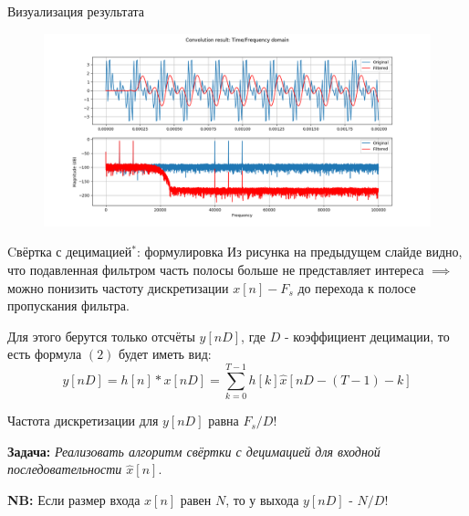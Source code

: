 \documentclass{beamer}
\begin{document}
    \begin{frame}{Визуализация результата}
        \begin{figure}[!tbp]
           \centering
           \includegraphics[width=\textwidth]{pics/result_regular.png}
           \captionsetup{justification=centering}
        \end{figure}
    \end{frame}
    \begin{frame}{Cвёртка с децимацией$^{*}$: формулировка}
        \justifying 
        Из рисунка на предыдущем слайде видно, что подавленная фильтром часть полосы больше не представляет интереса $\implies$ можно понизить частоту дискретизации $x[n] - F_{s}$ до перехода к полосе пропускания фильтра.
        \par
        Для этого берутся только отсчёты $y[nD]$, где $D$ - коэффициент децимации, то есть формула $(2)$ будет иметь вид:
        \begin{equation}
            y[nD] = h[n] * x[nD] = \sum_{k=0}^{T - 1} h[k]\hat x[nD - (T - 1) - k] \label{eq:conv_dec}
        \end{equation}
        \par
        Частота дискретизации для $y[nD]$ равна $F_{s}/D$!
        \par
        {\bf Задача:} {\it Реализовать алгоритм свёртки с децимацией для входной последовательности $\hat x[n]$}.
        \par
        {\bf NB:} Если размер входа $x[n]$ равен $N$, то у выхода $y[nD]$ - $N/D$!
    \end{frame}
\end{document}
